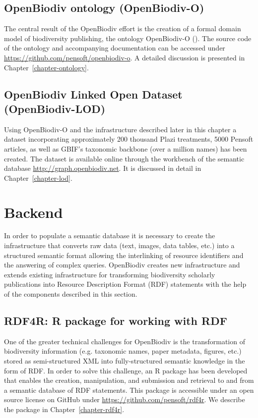 \subsection{OpenBiodiv ontology (OpenBiodiv-O)}

The central result of the OpenBiodiv effort is the creation of a formal domain model of biodiversity publishing, the ontology OpenBiodiv-O (\cite{senderov_openbiodiv_2017}). The source code of the ontology and accompanying documentation can be accessed under \url{https://github.com/pensoft/openbiodiv-o}. A detailed discussion is presented in Chapter~\ref{chapter-ontology}.

\subsection{OpenBiodiv Linked Open Dataset (OpenBiodiv-LOD)}

Using OpenBiodiv-O and the infrastructure described later in this chapter a dataset incorporating approximately 200 thousand Plazi treatments, 5000 Pensoft articles, as well as GBIF’s taxonomic backbone (over a million names) has been created. The dataset is available online through the workbench of the semantic database \url{http://graph.openbiodiv.net}. It is discussed in detail in Chapter~\ref{chapter-lod}.

\section{Backend}

In order to populate a semantic database it is necessary to create the infrastructure that converts raw data (text, images, data tables, etc.) into a structured semantic format allowing the interlinking of resource identifiers and the answering of complex queries. OpenBiodiv creates new infrastructure and extends existing infrastructure for transforming biodiversity scholarly publications into Resource Description Format (RDF) statements with the help of the components described in this section.

\subsection{RDF4R: R package for working with RDF}

One of the greater technical challenges for OpenBiodiv is the transformation of biodiversity information (e.g. taxonomic names, paper metadata, figures, etc.) stored as semi-structured XML into fully-structured semantic knowledge in the form of RDF. In order to solve this challenge, an R package has been developed that enables the creation, manipulation, and submission and retrieval to and from a semantic database of RDF statements. This package is accessible under an open source license on GitHub under \url{https://github.com/pensoft/rdf4r}. We describe the package in Chapter~\ref{chapter-rdf4r}.

